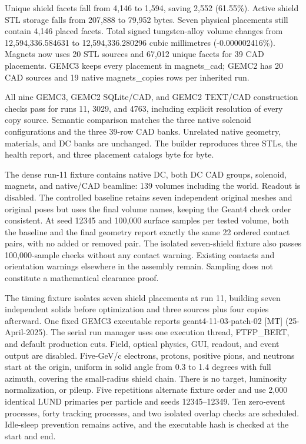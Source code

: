 Unique shield facets fall from 4,146 to 1,594, saving 2,552 (61.55\%). Active shield STL storage falls from
207,888 to 79,952 bytes. Seven physical placements still contain 4,146 placed facets. Total signed
tungsten-alloy volume changes from 12,594,336.584631 to 12,594,336.280296 cubic millimetres (-0.000002416\%).
Magnets now uses 20 STL sources and 67,012 unique facets for 39 CAD placements. GEMC3 keeps every placement in
magnets\_cad; GEMC2 has 20 CAD sources and 19 native magnets\_copies rows per inherited run.

All nine GEMC3, GEMC2 SQLite/CAD, and GEMC2 TEXT/CAD construction checks pass for runs 11, 3029, and 4763,
including explicit resolution of every copy source. Semantic comparison matches the three native solenoid
configurations and the three 39-row CAD banks. Unrelated native geometry, materials, and DC banks are
unchanged. The builder reproduces three STLs, the health report, and three placement catalogs byte for byte.

The dense run-11 fixture contains native DC, both DC CAD groups, solenoid, magnets, and native/CAD beamline:
139 volumes including the world. Readout is disabled. The controlled baseline retains seven independent
original meshes and original poses but uses the final volume names, keeping the Geant4 check order consistent.
At seed 12345 and 100,000 surface samples per tested volume, both the baseline and the final geometry report
exactly the same 22 ordered contact pairs, with no added or removed pair. The isolated seven-shield fixture
also passes 100,000-sample checks without any contact warning. Existing contacts and orientation warnings
elsewhere in the assembly remain. Sampling does not constitute a mathematical clearance proof.

The timing fixture isolates seven shield placements at run 11, building seven independent solids before
optimization and three sources plus four copies afterward. One fixed GEMC3 executable reports
geant4-11-03-patch-02 [MT]   (25-April-2025). The serial run manager uses one execution thread, FTFP\_BERT,
and default production cuts. Field, optical physics, GUI, readout, and event output are disabled. Five-GeV/c
electrons, protons, positive pions, and neutrons start at the origin, uniform in solid angle from 0.3 to 1.4
degrees with full azimuth, covering the small-radius shield chain. There is no target, luminosity
normalization, or pileup. Five repetitions alternate fixture order and use 2,000 identical LUND primaries per
particle and seeds 12345--12349. Ten zero-event processes, forty tracking processes, and two isolated overlap
checks are scheduled. Idle-sleep prevention remains active, and the executable hash is checked at the start
and end.


